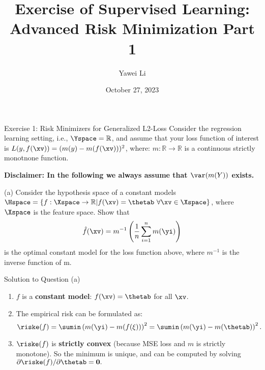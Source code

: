 \documentclass[aspectratio=169]{beamer}
\title[]{\textbf{Exercise of Supervised Learning:\\ Advanced Risk Minimization Part 1}}
\author{Yawei Li}
\institute[LMU]
{
\\
  \texttt{yawei.li@stat.uni-muenchen.de}
}
\date{October 27, 2023}
\begin{document}
\begin{frame}
\titlepage

\end{frame}

\begin{frame}{Exercise 1: Risk Minimizers for Generalized L2-Loss}
Consider the regression learning setting, i.e., $\Yspace = \mathbb{R}$, and assume that your loss function of interest is $L(y, f(\xv)) = (m(y) - m(f(\xv)))^2$, where: $m: \mathbb{R} \to \mathbb{R}$ is a continuous strictly monotnone function.

\textbf{Disclaimer: In the following we always assume that $\var(m(Y))$ exists.}

(a) Consider the hypothesis space of a constant models $\Hspace = \{f: \Xspace \rightarrow \mathbb{R} | f(\xv) = \thetab \ \forall \xv \in \Xspace \}$, where $\Xspace$ is the feature space. Show that 
$$
	\hat{f}(\xv) = m^{-1}\left( \frac{1}{n} \sum_{i=1}^n m(\yi) \right)
$$
is the optimal constant model for the loss function above, where $m^{-1}$ is the inverse function of m.
	
\end{frame}

\begin{frame}{Solution to Question (a)}
	\begin{enumerate}
		\item<1-> $f$ is a \textbf{constant model}: $f(\xv) = \thetab$ for all $\xv$.
		\item<2-> The empirical risk can be formulated as:
			$$\riske(f) = \sumin \left(m(\yi) - m(f(\xi)) \right)^2 = \sumin \left(m(\yi) - m(\thetab) \right)^2.$$
		\item<3-> $\riske(f)$ is \textbf{strictly convex} (because MSE loss and $m$ is strictly monotone). So the minimum is unique, and can be computed by solving $\partial{\riske(f)} / \partial \thetab = \bm{0}.$
	\end{enumerate}
\end{frame}
\end{document}
